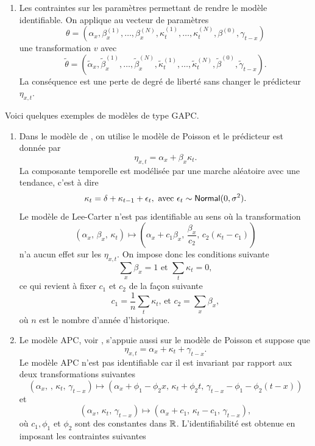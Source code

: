 \begin{enumerate}
  \item Les contraintes sur les paramètres permettant de rendre le modèle identifiable. On applique au vecteur de paramètres
  $$
  \theta = \left(\alpha_x,\beta_{x}^{(1)},\ldots, \beta_x^{(N)},\kappa_{t}^{(1)},\ldots, \kappa_{t}^{(N)}, \beta^{(0)}, \gamma_{t-x}\right)
  $$
  une transformation $v$ avec 
$$
  \tilde{\theta} = \left(\tilde{\alpha}_x,\tilde{\beta}_{x}^{(1)},\ldots, \tilde{\beta}_x^{(N)},\tilde{\kappa}_{t}^{(1)},\ldots, \tilde{\kappa}_{t}^{(N)}, \tilde{\beta}^{(0)}, \tilde{\gamma}_{t-x}\right).
$$
La conséquence est une perte de degré de liberté sans changer le prédicteur $\eta_{x,t}$.
\end{enumerate}

\begin{ex}
Voici quelques exemples de modèles de type GAPC.
\begin{enumerate}
  \item Dans le modèle de \citet{Lee1992}, on utilise le modèle de Poisson et le prédicteur est donnée par 
  $$
  \eta_{x,t} = \alpha_x +\beta_x\kappa_t.
  $$
  La composante temporelle est modélisée par une marche aléatoire avec une tendance, c'est à dire 
  $$
  \kappa_t = \delta + \kappa_{t-1}+ \epsilon_t,\text{ avec }\epsilon_t\sim\mathsf{Normal}(0,\sigma^2).
  $$
  Le modèle de Lee-Carter n'est pas identifiable au sens où la transformation 
  $$
  (\alpha_x\text{, }\beta_x\text{, }\kappa_t)\mapsto\left(\alpha_x + c_1\beta_x\text{, } \frac{\beta_x}{c_2}\text{, } c_2(\kappa_t-c_1)\right)
  $$
  n'a aucun effet sur les $\eta_{x,t}$. On impose donc les conditions suivante 
  $$
  \sum_x \beta_x=1 \text{ et }\sum_t\kappa_t =0,
   $$
   ce qui revient à fixer $c_1$ et $c_2$ de la façon suivante
   $$
   c_1=\frac{1}{n}\sum_{t}\kappa_t\text{, et }c_2 = \sum_x\beta_x,
   $$
   où $n$ est le nombre d'année d'historique.
  \item Le modèle APC, voir \citet{Clayton1987}, s'appuie aussi sur le modèle de Poisson et suppose que 
  $$
  \eta_{x,t}= \alpha_x + \kappa_t + \gamma_{t-x}.
  $$
  Le modèle APC n'est pas identifiable car il est invariant par rapport aux deux transformations suivantes
  $$
  (\alpha_x\text{, }\text{, }\kappa_t\text{, }\gamma_{t-x})\mapsto\left(\alpha_x + \phi_1-\phi_2x\text{, } \kappa_t+\phi_2 t\text{, } \gamma_{t-x}-\phi_1 - \phi_2(t-x)\right)
  $$
  et 
  $$
  (\alpha_x\text{, }\kappa_t\text{, }\gamma_{t-x})\mapsto\left(\alpha_x + c_1\text{, } \kappa_t-c_1\text{, } \gamma_{t-x}\right),
  $$
  où $c_1,\phi_1$ et $\phi_2$ sont des constantes dans $\mathbb{R}$. L'identifiabilité est obtenue en imposant les contraintes suivantes

\end{enumerate}
\end{ex}
